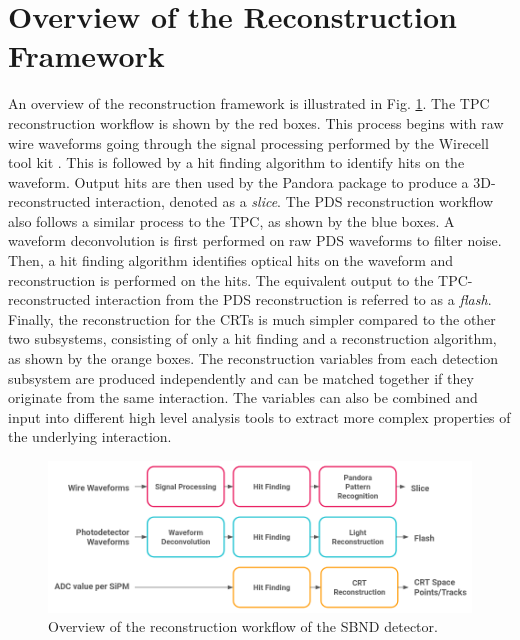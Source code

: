 
\section{Overview of the Reconstruction Framework}
\label{sec:reco_overview}

An overview of the reconstruction framework is illustrated in Fig. \ref{fig:Reco_Workflow}.
The TPC reconstruction workflow is shown by the red boxes.
This process begins with raw wire waveforms going through the signal processing performed by the Wirecell tool kit \cite{wirecell}.
This is followed by a hit finding algorithm to identify hits on the waveform.
Output hits are then used by the Pandora package \cite{pandora} to produce a 3D-reconstructed interaction, denoted as a \textit{slice}.
The PDS reconstruction workflow also follows a similar process to the TPC, as shown by the blue boxes.
A waveform deconvolution is first performed on raw PDS waveforms to filter noise.
Then, a hit finding algorithm identifies optical hits on the waveform and reconstruction is performed on the hits.
The equivalent output to the TPC-reconstructed interaction from the PDS reconstruction is referred to as a \textit{flash}.
Finally, the reconstruction for the CRTs is much simpler compared to the other two subsystems, consisting of only a hit finding and a reconstruction algorithm, as shown by the orange boxes.
The reconstruction variables from each detection subsystem are produced independently and can be matched together if they originate from the same interaction. 
The variables can also be combined and input into different high level analysis tools to extract more complex properties of the underlying interaction. 

\begin{figure}[htbp!] 
\centering    
\includegraphics[width=1.0\textwidth]{Reco_Workflow}
\caption[Reconstruction Framework of SBND]{
Overview of the reconstruction workflow of the SBND detector.
}
\label{fig:Reco_Workflow}
\end{figure}


